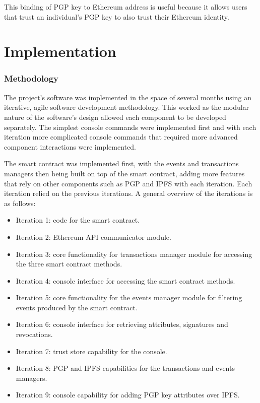 \documentclass[12pt]{report}
\begin{document}
	This binding of PGP key to Ethereum address is useful because it allows users that trust an individual's PGP key to also trust their Ethereum identity.
	
	\chapter{Implementation}
	
	\subsection{Methodology}
	The project's software was implemented in the space of several months using an iterative, agile software development methodology. This worked as the modular nature of the software's design allowed each component to be developed separately. The simplest console commands were implemented first and with each iteration more complicated console commands that required more advanced component interactions were implemented.
	
	The smart contract was implemented first, with the events and transactions managers then being built on top of the smart contract, adding more features that rely on other components such as PGP and IPFS with each iteration. Each iteration relied on the previous iterations. A general overview of the iterations is as follows:
	\begin{itemize}
		\item Iteration 1: code for the smart contract.
		\item Iteration 2: Ethereum API communicator module.
		\item Iteration 3: core functionality for transactions manager module for accessing the three smart contract methods.
		\item Iteration 4: console interface for accessing the smart contract methods.
		\item Iteration 5: core functionality for the events manager module for filtering events produced by the smart contract.
		\item Iteration 6: console interface for retrieving attributes, signatures and revocations.
		\item Iteration 7: trust store capability for the console.
		\item Iteration 8: PGP and IPFS capabilities for the transactions and events managers.
		\item Iteration 9: console capability for adding PGP key attributes over IPFS.
	\end{itemize}
	
\end{document}
